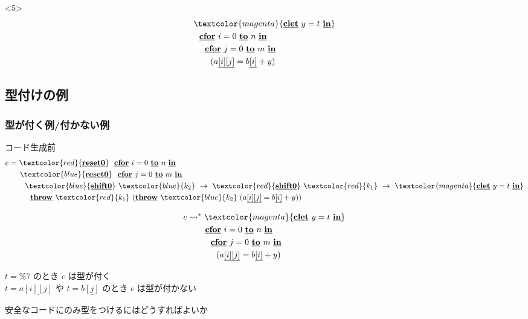 \documentclass[dvipdfmx,cjk,xcolor=dvipsnames,envcountsect,notheorems,12pt]{beamer}
\newcommand\cResetz{\underline{\textbf{reset0}}}
\newcommand\cShiftz{\underline{\textbf{shift0}}}
\newcommand\cThrow{\underline{\textbf{throw}}}
\newcommand\cLet{\underline{\textbf{clet}}}
\newcommand\cIn{\underline{\textbf{in}}}
\newcommand\csp[1]{\texttt{\%}{#1}}
\newcommand\too{\leadsto^*}
\newcommand\red[1]{\textcolor{red}{#1}}
\newcommand\magenta[1]{\textcolor{magenta}{#1}}
\newcommand\blue[1]{\textcolor{blue}{#1}}
\newcommand\cforin[2]{\underline{\textbf{cfor}}~{#1}~\underline{\textbf{to}}~{#2}~\underline{\textbf{in}}}
\newcommand\cArray[1]{\underline{[{#1}]}}
\newcommand\cArrays[2]{\underline{[{#1}][{#2}]}}
\theoremstyle{definition}
\begin{document}
\begin{frame}
  \begin{onlyenv}<5>
    \begin{align*}
      & \magenta{\cLet~y=t~\cIn} \\
      & ~~\cforin{i = 0}{n} \\
      & ~~~~\cforin{j = 0}{m} \\
      & ~~~~~~(a\cArrays{i}{j} = b\cArray{i} + y)
    \end{align*}
  \end{onlyenv}
\end{frame}

\subsection{型付けの例}

\begin{frame}
  \frametitle{型が付く例/付かない例}
  コード生成前
  \begin{align*}
    e & = \red{\cResetz} ~~\cforin{i = 0}{n} \\
      & \phantom{=}~~\blue{\cResetz} ~~\cforin{j = 0}{m} \\
      & \phantom{=}~~~~\blue{\cShiftz}~\blue{k_2}~\to~ \red{\cShiftz}~\red{k_1}~\to~ \magenta{\cLet~y=t~\cIn} \\
      & \phantom{=}~~~~~~\cThrow~\red{k_1}~(\cThrow~\blue{k_2}~(a\cArrays{i}{j} = b\cArray{i} + y))
  \end{align*}

  \pause

  \begin{align*}
    e & \too \magenta{\cLet~y=t~\cIn} \\
      & \phantom{\too}~~\cforin{i = 0}{n} \\
      & \phantom{\too}~~~~\cforin{j = 0}{m} \\
      & \phantom{\too}~~~~~~(a\cArrays{i}{j} = b\cArray{i} + y)
  \end{align*}

  \pause
  $t=\csp{7}$ のとき $e$ は型が付く\\
  $t=a\cArrays{i}{j}$ や $t=b\cArray{j}$ のとき $e$ は型が付かない
\end{frame}

\begin{frame}
  \center
  \huge{安全なコードにのみ型をつけるにはどうすればよいか}
\end{frame}
\end{document}
